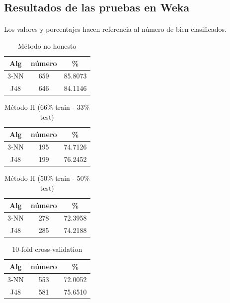 \documentclass[es]{ifirak}
\begin{document}
\subsection{Resultados de las pruebas en Weka} 
\paragraph{}
Los valores y porcentajes hacen referencia al número de bien clasificados.


\begin{table}[htbp]
\centering
\begin{tabular}{c|c|c}
Alg & número & \% \\
\hline
3-NN & 659 &  85.8073 \\
J48 & 646 & 84.1146 \\
\end{tabular}
\caption{Método no honesto}\label{table}
\end{table}

\begin{table}[htbp]
\centering
\begin{tabular}{c|c|c}
Alg & número & \% \\
\hline
3-NN & 195 &  74.7126 \\
J48 & 199 & 76.2452 \\
\end{tabular}
\caption{Método H (66\% train - 33\% test)}\label{table}
\end{table}

\begin{table}[htbp]
\centering
\begin{tabular}{c|c|c}
Alg & número & \% \\
\hline
3-NN & 278 &  72.3958 \\
J48 & 285 & 74.2188 \\
\end{tabular}
\caption{Método H (50\% train - 50\% test)}\label{table}
\end{table}

\begin{table}[htbp]
\centering
\begin{tabular}{c|c|c}
Alg & número & \% \\
\hline
3-NN & 553 &  72.0052 \\
J48 & 581 & 75.6510 \\
\end{tabular}
\caption{10-fold cross-validation}\label{table}
\end{table}
\end{document}
